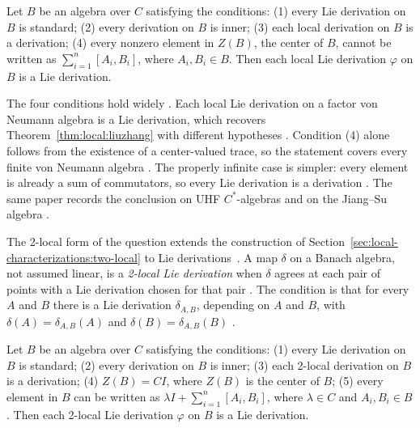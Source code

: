 \begin{theorem}\label{thm:local:hlah31}
Let $B$ be an algebra over $C$ satisfying the conditions: (1) every Lie
derivation on $B$ is standard; (2) every derivation on $B$ is inner;
(3) each local derivation on $B$ is a derivation; (4) every nonzero
element in $Z(B)$, the center of $B$, cannot be written as
$\sum_{i=1}^{n}[A_i,B_i]$, where $A_i,B_i\in B$. Then each local Lie
derivation $\varphi$ on $B$ is a Lie derivation.
\end{theorem}

The four conditions hold widely \cite[pp.~727--728]{HeLiAnHuang2018}. Each
local Lie derivation on a factor von Neumann algebra is a Lie derivation,
which recovers Theorem~\ref{thm:local:liuzhang} with different hypotheses
\cite[Corollary~3.2, p.~728]{HeLiAnHuang2018}. Condition (4) alone follows
from the existence of a center-valued trace, so the statement covers every
finite von Neumann algebra
\cite[Theorem~3.4 and Corollary~3.5, p.~728]{HeLiAnHuang2018}. The
properly infinite case is simpler: every element is already a sum of
commutators, so every Lie derivation is a derivation
\cite[Remark~3.6, p.~728]{HeLiAnHuang2018}. The same paper records the
conclusion on UHF $C^*$-algebras and on the Jiang--Su algebra
\cite[Corollaries~3.7 and~3.8, p.~728]{HeLiAnHuang2018}.

The 2-local form of the question extends the construction of
Section~\ref{sec:local-characterizations:two-local} to Lie derivations~\cite[p.~243]{YangFang2019}. A
map $\delta$ on a
Banach algebra, not assumed linear, is a \emph{2-local Lie derivation}
when $\delta$ agrees at each pair of points with a Lie derivation chosen
for that pair \cite[p.~243]{YangFang2019}. The condition is
that for every $A$ and $B$ there is a Lie derivation
$\delta_{A,B}$, depending on $A$ and $B$, with
$\delta(A)=\delta_{A,B}(A)$ and $\delta(B)=\delta_{A,B}(B)$
\cite[p.~243]{YangFang2019}.

\begin{theorem}\label{thm:local:hlah39}
Let $B$ be an algebra over $C$ satisfying the conditions: (1) every Lie
derivation on $B$ is standard; (2) every derivation on $B$ is inner;
(3) each 2-local derivation on $B$ is a derivation; (4) $Z(B)=CI$, where
$Z(B)$ is the center of $B$; (5) every element in $B$ can be written as
$\lambda I+\sum_{i=1}^{n}[A_i,B_i]$, where $\lambda\in C$ and
$A_i,B_i\in B$. Then each 2-local Lie derivation $\varphi$ on $B$ is a Lie
derivation.
\end{theorem}

